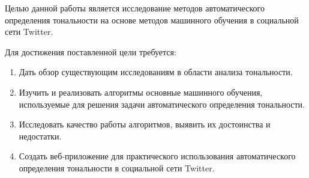 \vspace{0.5cm}

 Целью данной работы является исследование методов автоматического определения тональности на основе методов машинного обучения в социальной сети Twitter. 
 
 Для достижения поставленной цели требуется:
 \begin{enumerate}
 \item Дать обзор существующим исследованиям в области анализа тональности.
 \item Изучить и реализовать алгоритмы основные машинного обучения, используемые для решения задачи автоматического определения тональности.
 \item Исследовать качество работы алгоритмов, выявить их достоинства и недостатки.
 \item Создать веб-приложение для практического использования автоматического определения тональности в социальной сети Twitter. 
 \end{enumerate}